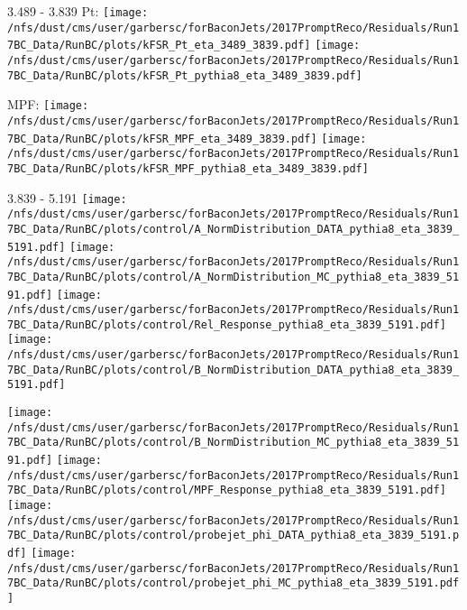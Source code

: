 \documentclass[t,compress]{beamer}
\begin{document}
\begin{frame}{3.489 - 3.839}
	 Pt: \texttt{[image: /nfs/dust/cms/user/garbersc/forBaconJets/2017PromptReco/Residuals/Run17BC\_Data/RunBC/plots/kFSR\_Pt\_eta\_3489\_3839.pdf]}
	\texttt{[image: /nfs/dust/cms/user/garbersc/forBaconJets/2017PromptReco/Residuals/Run17BC\_Data/RunBC/plots/kFSR\_Pt\_pythia8\_eta\_3489\_3839.pdf]}
\newline

	 MPF: \texttt{[image: /nfs/dust/cms/user/garbersc/forBaconJets/2017PromptReco/Residuals/Run17BC\_Data/RunBC/plots/kFSR\_MPF\_eta\_3489\_3839.pdf]}
	\texttt{[image: /nfs/dust/cms/user/garbersc/forBaconJets/2017PromptReco/Residuals/Run17BC\_Data/RunBC/plots/kFSR\_MPF\_pythia8\_eta\_3489\_3839.pdf]}
\end{frame}

\begin{frame}{3.839 - 5.191}
	\texttt{[image: /nfs/dust/cms/user/garbersc/forBaconJets/2017PromptReco/Residuals/Run17BC\_Data/RunBC/plots/control/A\_NormDistribution\_DATA\_pythia8\_eta\_3839\_5191.pdf]}
	\texttt{[image: /nfs/dust/cms/user/garbersc/forBaconJets/2017PromptReco/Residuals/Run17BC\_Data/RunBC/plots/control/A\_NormDistribution\_MC\_pythia8\_eta\_3839\_5191.pdf]}
	\texttt{[image: /nfs/dust/cms/user/garbersc/forBaconJets/2017PromptReco/Residuals/Run17BC\_Data/RunBC/plots/control/Rel\_Response\_pythia8\_eta\_3839\_5191.pdf]}
	\texttt{[image: /nfs/dust/cms/user/garbersc/forBaconJets/2017PromptReco/Residuals/Run17BC\_Data/RunBC/plots/control/B\_NormDistribution\_DATA\_pythia8\_eta\_3839\_5191.pdf]}
\newline

	\texttt{[image: /nfs/dust/cms/user/garbersc/forBaconJets/2017PromptReco/Residuals/Run17BC\_Data/RunBC/plots/control/B\_NormDistribution\_MC\_pythia8\_eta\_3839\_5191.pdf]}
	\texttt{[image: /nfs/dust/cms/user/garbersc/forBaconJets/2017PromptReco/Residuals/Run17BC\_Data/RunBC/plots/control/MPF\_Response\_pythia8\_eta\_3839\_5191.pdf]}
	\texttt{[image: /nfs/dust/cms/user/garbersc/forBaconJets/2017PromptReco/Residuals/Run17BC\_Data/RunBC/plots/control/probejet\_phi\_DATA\_pythia8\_eta\_3839\_5191.pdf]}
	\texttt{[image: /nfs/dust/cms/user/garbersc/forBaconJets/2017PromptReco/Residuals/Run17BC\_Data/RunBC/plots/control/probejet\_phi\_MC\_pythia8\_eta\_3839\_5191.pdf]}
\end{frame}
\end{document}

